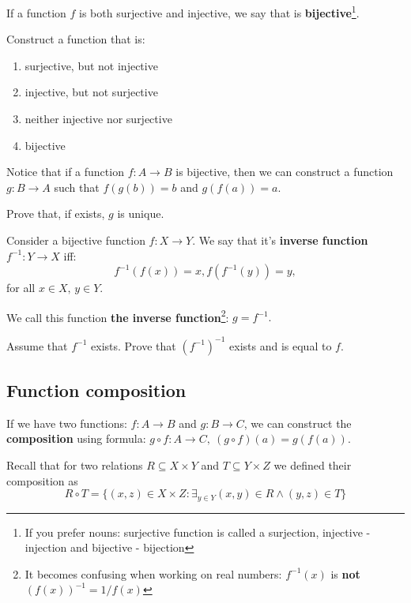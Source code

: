 \begin{definition}
If a function $f$ is both surjective and injective, we say that is \textbf{bijective}\footnote{If you prefer nouns: surjective function is called a surjection, injective - injection
and bijective - bijection}.
\end{definition}

\begin{exercise}
	Construct a function that is:
	\begin{enumerate}
		\item surjective, but not injective
		\item injective, but not surjective
		\item neither injective nor surjective
		\item bijective
	\end{enumerate}
\end{exercise}

\noindent Notice that if a function $f: A\to B$ is bijective, then we can construct a function $g:B\to A$
such that $f(g(b))=b$ and $g(f(a))=a$.

\begin{prob}
	Prove that, if exists, $g$ is unique.
\end{prob}

\begin{definition}
  Consider a bijective function $f:X\to Y$. We say that it's \textbf{inverse function} $f^{-1}:Y\to X$ iff:
  $$f^{-1}(f(x))=x, f(f^{-1}(y))=y,$$
  for all $x\in X,\, y\in Y$.
\end{definition}

\noindent We call this function \textbf{the inverse function}\footnote{It becomes confusing when working on real numbers: $f^{-1}(x)$ is
\textbf{not} $(f(x))^{-1}=1/f(x)$}: $g=f^{-1}.$

\begin{prob}
	Assume that $f^{-1}$ exists. Prove that $(f^{-1})^{-1}$ exists and is equal to $f$.
\end{prob}

\subsection{Function composition}
If we have two functions: $f:A\to B$ and $g: B\to C$, we can construct the \textbf{composition} using formula:
$g\circ f: A\to C,~(g\circ f)(a) = g(f(a)).$

\begin{exercise}
  Recall that for two relations $R\subseteq X\times Y$ and $T\subseteq Y\times Z$ we defined their composition as $$R\circ T=\{(x,z)\in X\times Z : \exists_{y\in Y} (x,y)\in R \wedge (y,z)\in T\}$$
\end{exercise}

